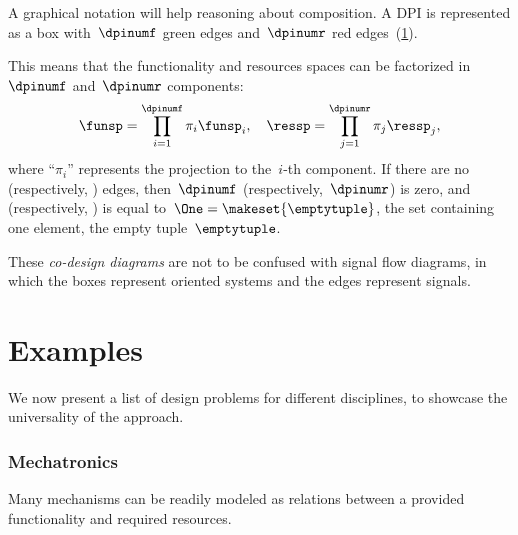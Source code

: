 A graphical notation will help reasoning about composition.
A DPI is represented as a box with~$\dpinumf$ green edges and~$\dpinumr$ red edges~(\cref{fig:dp_graphical}).

\begin{figure}[h]
    \centering
    \caption{\label{fig:dp_graphical}}
\end{figure}


This means that the functionality and resources spaces can be factorized in~$\dpinumf$ and~$\dpinumr$ components:
\begin{equation}
    \funsp=\prod_{i=1}^{\dpinumf}\pi_{i}\funsp_{i},\quad \ressp=\prod_{j=1}^{\dpinumr}\pi_{j}\ressp_{j},
\end{equation}
where ``$\pi_{i}$'' represents the projection to the~$i$-th component.
If there are no  (respectively, ) edges, then~$\dpinumf$ (respectively,~$\dpinumr$) is zero, and \funsp (respectively, \ressp) is equal to~$\One=\makeset{\emptytuple }$, the set containing one element, the empty tuple~$\emptytuple$.

These \emph{co-design diagrams} are not to be confused with signal flow diagrams, in which the boxes represent oriented systems and the edges represent signals.


\section{Examples}
We now present a list of design problems for different disciplines, to showcase the universality of the approach.

\subsubsection{Mechatronics}
Many mechanisms can be readily modeled as relations between a provided functionality and required resources.


